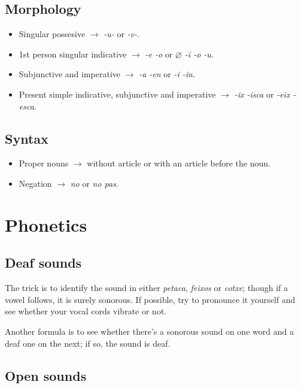 \documentclass{article}
\begin{document}
\subsection*{Morphology}

\begin{itemize}
    \item Singular possesive $\rightarrow$ \emph{-u-} or \emph{-v-}.
    \item 1st person singular indicative $\rightarrow$ \emph{-e -o} or
    \emph{$\varnothing$ -i -o -u}.
    \item Subjunctive and imperative $\rightarrow$ \emph{-a -en} or
    \emph{-i -in}.
    \item Present simple indicative, subjunctive and imperative $\rightarrow$
    \emph{-ix -isca} or \emph{-eix -esca}.
\end{itemize}

\subsection*{Syntax}

\begin{itemize}
    \item Proper nouns $\rightarrow$ without article or with an article before
    the noun.
    \item Negation $\rightarrow$ \emph{no} or \emph{no pas}.
\end{itemize}

\section*{Phonetics}

\subsection*{Deaf sounds}

The trick is to identify the sound in either \emph{petaca}, \emph{feixos} or
\emph{cotxe}; though if a vowel follows, it is surely sonorous.
If possible, try to pronounce it yourself and see whether your vocal cords
vibrate or not.

Another formula is to see whether there's a sonorous sound on one word and a
deaf one on the next; if so, the sound is deaf.

\subsection*{Open sounds}
\end{document}

